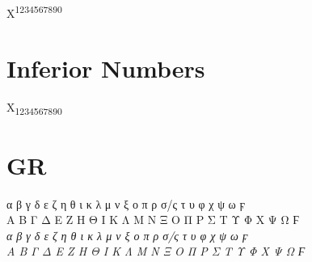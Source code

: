 \documentclass[a4paper]{article}
\begin{document}
X\textsuperscript{1234567890}

\section*{Inferior Numbers}

X\textsubscript{1234567890}

\section*{GR}

 α β γ δ ε ζ η θ ι κ λ μ ν ξ ο π ρ σ/ς τ υ φ χ ψ ω ϝ \\
 Α Β Γ Δ Ε Ζ Η Θ Ι Κ Λ Μ Ν Ξ Ο Π Ρ Σ Τ Υ Φ Χ Ψ Ω Ϝ\\
\textit{ α β γ δ ε ζ η θ ι κ λ μ ν ξ ο π ρ σ/ς τ υ φ χ ψ ω ϝ\\
 Α Β Γ Δ Ε Ζ Η Θ Ι Κ Λ Μ Ν Ξ Ο Π Ρ Σ Τ Υ Φ Χ Ψ Ω Ϝ}\par
 
\end{document}
